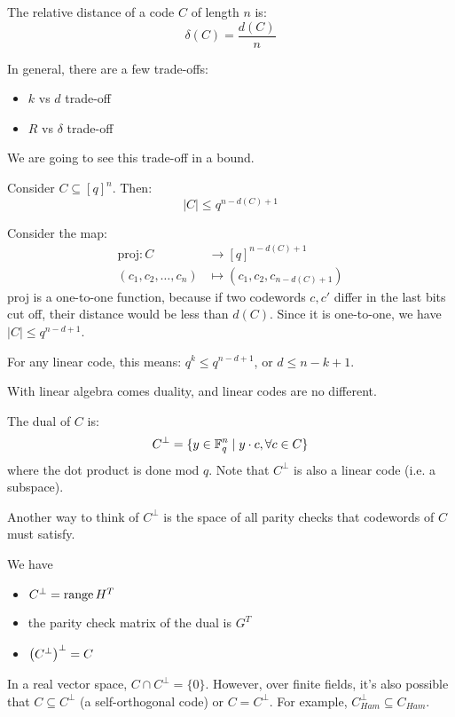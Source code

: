 \begin{definition}
    The relative distance of a code $C$ of length $n$ is:
    \[ \delta(C) = \frac{d(C)}{n} \]
\end{definition}
In general, there are a few trade-offs:
\begin{itemize}
    \item $k$ vs $d$ trade-off
    \item $R$ vs $\delta$ trade-off
\end{itemize}

We are going to see this trade-off in a bound.
\begin{theorem}
    Consider $C \subseteq [q]^n$. Then:
    \[ |C| \leq q^{n - d(C) + 1} \]

\begin{proof*}
Consider the map:
\begin{align*}
\text{proj}: C &\to [q]^{n - d(C) + 1} \\
(c_1, c_2, \dots, c_n) &\mapsto (c_1, c_2, c_{n - d(C) + 1})
\end{align*}
proj is a one-to-one function, because if two codewords $c, c'$ differ in the last bits cut off, their distance would be less than
$d(C)$. Since it is one-to-one, we have $|C| \leq q^{n - d + 1}$.
\end{proof*}
\end{theorem}
For any linear code, this means: $q^{k} \leq q^{n - d + 1}$, or
$d \leq n - k + 1$.

With linear algebra comes duality, and linear codes are no different.
\begin{definition}
    The dual of $C$ is:
    \[ C^{\perp} = \{y \in \operatorname{\mathbb{F}}_q^n \mid y \cdot c, \forall c \in C\} \]
    where the dot product is done mod $q$. Note that $C^{\perp}$ is also a linear code (i.e. a subspace).
\end{definition}

Another way to think of $C^{\perp}$ is the space of all parity checks that codewords of $C$ must satisfy.

\begin{note}
    We have
    \begin{itemize}
        \item $C^{\perp} = \operatorname{range}{H^T}$
        \item the parity check matrix of the dual is $G^T$
        \item $\qty(C^{\perp})^{\perp} = C$
    \end{itemize}

    In a real vector space, $C \cap C^{\perp} = \{0\}$.
    However, over finite fields, it's also possible that $C \subseteq C^{\perp}$ (a self-orthogonal code) or $C = C^{\perp}$.
    For example, $C_{Ham}^{\perp} \subseteq C_{Ham}$.
\end{note}

